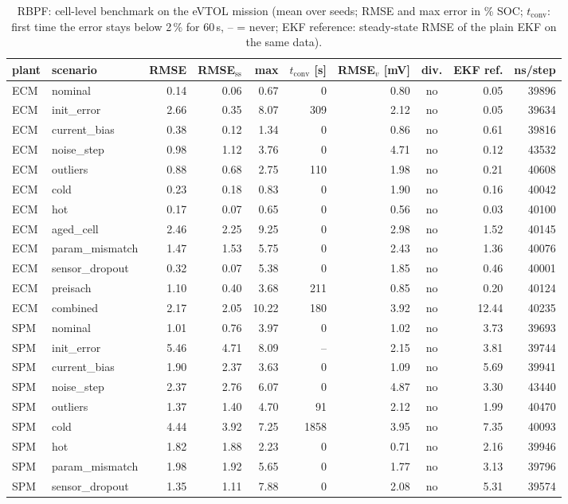 \begin{table}[H]\centering\footnotesize\setlength{\tabcolsep}{4pt}
\caption{RBPF: cell-level benchmark on the eVTOL mission (mean over seeds; RMSE and max error in \% SOC; $t_\mathrm{conv}$: first time the error stays below 2\,\% for 60\,s, -- = never; EKF reference: steady-state RMSE of the plain EKF on the same data).}\label{tab:cell_RBPF}
\begin{tabular}{llrrrrrcrr}\toprule
plant & scenario & RMSE & RMSE$_\mathrm{ss}$ & max & $t_\mathrm{conv}$ [s] & RMSE$_v$ [mV] & div. & EKF ref. & ns/step \\ \midrule
ECM & nominal & 0.14 & 0.06 & 0.67 & 0 & 0.80 & no & 0.05 & 39896 \\
ECM & init\_error & 2.66 & 0.35 & 8.07 & 309 & 2.12 & no & 0.05 & 39634 \\
ECM & current\_bias & 0.38 & 0.12 & 1.34 & 0 & 0.86 & no & 0.61 & 39816 \\
ECM & noise\_step & 0.98 & 1.12 & 3.76 & 0 & 4.71 & no & 0.12 & 43532 \\
ECM & outliers & 0.88 & 0.68 & 2.75 & 110 & 1.98 & no & 0.21 & 40608 \\
ECM & cold & 0.23 & 0.18 & 0.83 & 0 & 1.90 & no & 0.16 & 40042 \\
ECM & hot & 0.17 & 0.07 & 0.65 & 0 & 0.56 & no & 0.03 & 40100 \\
ECM & aged\_cell & 2.46 & 2.25 & 9.25 & 0 & 2.98 & no & 1.52 & 40145 \\
ECM & param\_mismatch & 1.47 & 1.53 & 5.75 & 0 & 2.43 & no & 1.36 & 40076 \\
ECM & sensor\_dropout & 0.32 & 0.07 & 5.38 & 0 & 1.85 & no & 0.46 & 40001 \\
ECM & preisach & 1.10 & 0.40 & 3.68 & 211 & 0.85 & no & 0.20 & 40124 \\
ECM & combined & 2.17 & 2.05 & 10.22 & 180 & 3.92 & no & 12.44 & 40235 \\
\midrule
SPM & nominal & 1.01 & 0.76 & 3.97 & 0 & 1.02 & no & 3.73 & 39693 \\
SPM & init\_error & 5.46 & 4.71 & 8.09 & -- & 2.15 & no & 3.81 & 39744 \\
SPM & current\_bias & 1.90 & 2.37 & 3.63 & 0 & 1.09 & no & 5.69 & 39941 \\
SPM & noise\_step & 2.37 & 2.76 & 6.07 & 0 & 4.87 & no & 3.30 & 43440 \\
SPM & outliers & 1.37 & 1.40 & 4.70 & 91 & 2.12 & no & 1.99 & 40470 \\
SPM & cold & 4.44 & 3.92 & 7.25 & 1858 & 3.95 & no & 7.35 & 40093 \\
SPM & hot & 1.82 & 1.88 & 2.23 & 0 & 0.71 & no & 2.16 & 39946 \\
SPM & param\_mismatch & 1.98 & 1.92 & 5.65 & 0 & 1.77 & no & 3.13 & 39796 \\
SPM & sensor\_dropout & 1.35 & 1.11 & 7.88 & 0 & 2.08 & no & 5.31 & 39574 \\
\bottomrule\end{tabular}\end{table}
